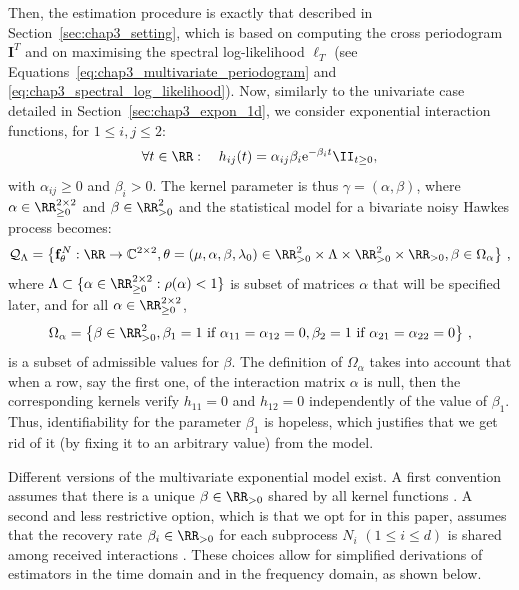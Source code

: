       Then, the estimation procedure is exactly that described in Section~\ref{sec:chap3_setting},
      which is based on computing the cross periodogram $\mathbf I^T$ and on maximising the spectral log-likelihood $\ell_T$ (see Equations~\eqref{eq:chap3_multivariate_periodogram} and \eqref{eq:chap3_spectral_log_likelihood}).
      Now, similarly to the univariate case detailed in Section~\ref{sec:chap3_expon_1d}, we consider exponential interaction functions, \ie for $1 \le i, j \le 2$:
      \[
        \forall t \in \RR: \quad
        h_{ij}(t) = \alpha_{ij} \beta_i \mathrm e^{-\beta_i t} \II_{t \ge 0},
      \]
      with $\alpha_{ij} \ge 0$ and $\beta_i > 0$.
      The kernel parameter is thus $\gamma = (\alpha, \beta)$, where $\alpha \in \RR_{\ge 0}^{2 \times 2}$ and $\beta \in \RR_{>0}^2$ and the statistical model for a bivariate noisy Hawkes process becomes:
      \[
        \mathcal Q_\Lambda =
        \left\{
          \mathbf{f}_{\theta}^N : \RR \to \mathbb C^{2 \times 2},
          \theta = (\mu, \alpha, \beta, \lambda_0)
          \in \RR_{>0}^2\times \Lambda \times \RR_{>0}^2 \times \RR_{>0},
          \beta \in \Omega_\alpha
        \right\}\,,
      \]
      where $\Lambda \subset \{\alpha \in \RR_{\geq 0}^{2\times 2} : \rho(\alpha) < 1\}$ is subset of matrices $\alpha$ that will be specified later,
      and for all $\alpha \in \RR_{\geq 0}^{2\times 2}$,
      \[
        \Omega_\alpha =
        \left\{
          \beta \in \RR_{>0}^2,
          \beta_1 = 1 \text{ if } \alpha_{11} = \alpha_{12} = 0,
          \beta_2 = 1 \text{ if } \alpha_{21} = \alpha_{22} = 0
        \right\} \,,
      \]
      is a subset of admissible values for $\beta$.
      The definition of $\Omega_\alpha$
      takes into account that when a row, say the first one, of the interaction matrix $\alpha$ is null, then the corresponding kernels verify $h_{11}=0$ and $h_{12}=0$ independently of the value of $\beta_1$.
      Thus, identifiability for the parameter $\beta_1$ is hopeless, which justifies that we get rid of it (by fixing it to an arbitrary value) from the model.
      
      \begin{remark}
        Different versions of the multivariate exponential model exist. A first convention assumes that there is a unique $\beta\in\RR_{>0}$ shared by all kernel functions \parencite{Chevallier2019, Bacry2020}. A second and less restrictive option, which is that we opt for in this paper, assumes that the recovery rate $\beta_i\in\RR_{>0}$ for each subprocess $N_i$ $(1 \le i \le d)$ is shared among received interactions \parencite{Bonnet2023}. These choices allow for simplified derivations of estimators in the time domain and in the frequency domain, as shown below.  
      \end{remark}
      
